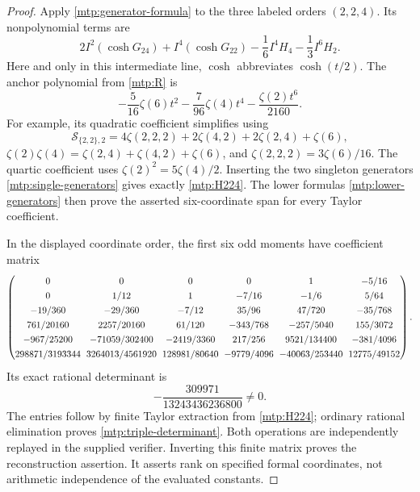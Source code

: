 \documentclass[11pt,letterpaper]{article}
\numberwithin{equation}{section}
\theoremstyle{definition}
\theoremstyle{remark}
\begin{document}
\begin{proof}
Apply \eqref{mtp:generator-formula} to the three labeled orders
$(2,2,4)$. Its nonpolynomial terms are
\[
 2I^2(\cosh G_{24})+I^4(\cosh G_{22})
                      -\frac16I^4H_4-\frac13I^6H_2.
\]
Here and only in this intermediate line, $\cosh$ abbreviates
$\cosh(t/2)$. The anchor polynomial from \eqref{mtp:R} is
\[
          -\frac5{16}\zeta(6)t^2-\frac7{96}\zeta(4)t^4
                                      -\frac{\zeta(2)t^6}{2160}.
\]
For example, its quadratic coefficient simplifies using
\[
 \mathcal S_{\{2,2\},2}
  =4\zeta(2,2,2)+2\zeta(4,2)+2\zeta(2,4)+\zeta(6),
\]
$\zeta(2)\zeta(4)=\zeta(2,4)+\zeta(4,2)+\zeta(6)$, and
$\zeta(2,2,2)=3\zeta(6)/16$. The quartic coefficient uses
$\zeta(2)^2=5\zeta(4)/2$. Inserting the two singleton generators
\eqref{mtp:single-generators} gives exactly \eqref{mtp:H224}.
The lower formulas \eqref{mtp:lower-generators} then prove the asserted
six-coordinate span for every Taylor coefficient.

In the displayed coordinate order, the first six odd moments have
coefficient matrix
\begin{equation}\label{mtp:triple-matrix}
\begingroup\setlength{\arraycolsep}{3pt}\renewcommand{\arraystretch}{1.3}
\begin{pmatrix}
0&0&0&0&1&-5/16\\
0&1/12&1&-7/16&-1/6&5/64\\
-19/360&-29/360&-7/12&35/96&47/720&-35/768\\
761/20160&2257/20160&61/120&-343/768&-257/5040&155/3072\\
-967/25200&-71059/302400&-2419/3360&217/256&9521/134400&-381/4096\\
298871/3193344&3264013/4561920&128981/80640&-9779/4096&-40063/253440&12775/49152
\end{pmatrix}.
\endgroup
\end{equation}
Its exact rational determinant is
\begin{equation}\label{mtp:triple-determinant}
                         -\frac{309971}{13243436236800}\ne0.
\end{equation}
The entries follow by finite Taylor extraction from
\eqref{mtp:H224}; ordinary rational elimination proves
\eqref{mtp:triple-determinant}. Both operations are independently
replayed in the supplied verifier. Inverting this finite matrix proves
the reconstruction assertion. It asserts rank on specified formal
coordinates, not arithmetic independence of the evaluated constants.
\end{proof}
\end{document}
